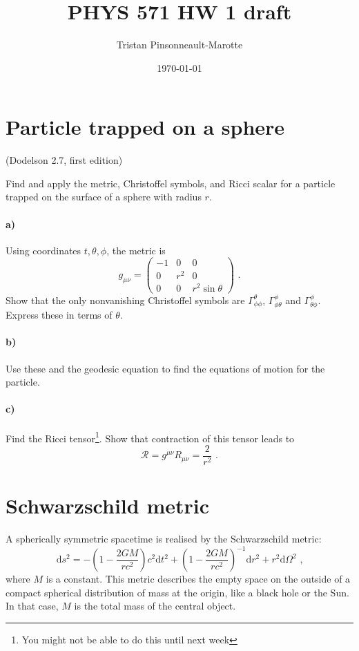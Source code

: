 \documentclass[12pt]{article}
\author{Tristan Pinsonneault-Marotte}
\title{PHYS 571 HW 1 draft}
\date{\today}
\newcommand\diff{\mathrm{d}}
\begin{document}
\maketitle

\section{Particle trapped on a sphere}
(Dodelson 2.7, first edition)

Find and apply the metric, Christoffel symbols, and Ricci scalar for a particle
trapped on the surface of a sphere with radius $r$.

\paragraph{a)} Using coordinates $t, \theta, \phi$, the metric is
\begin{equation}
    g_{\mu\nu} = \begin{pmatrix}
        -1 & 0 & 0 \\
        0 & r^2 & 0 \\
        0 & 0 & r^2 \sin\theta
    \end{pmatrix}
    \text{ .}
\end{equation}
Show that the only nonvanishing Christoffel symbols are
$\Gamma^\theta_{\phi\phi}$, $\Gamma^\phi_{\phi\theta}$ and
$\Gamma^\phi_{\theta\phi}$. Express these in terms of $\theta$.

\paragraph{b)} Use these and the geodesic equation to find the equations of
motion for the particle.

\paragraph{c)} Find the Ricci tensor\footnote{You might not be able to do this until next week}. Show that contraction of this tensor leads
to
\begin{equation}
    \mathcal{R} = g^{\mu\nu} R_{\mu\nu} = \frac{2}{r^2} \text{ .}
\end{equation}

\section{Schwarzschild metric}

A spherically symmetric spacetime is realised by the Schwarzschild metric:
\begin{equation}
    \diff s^2 = - \left(1 - \frac{2 G M}{r c^2}\right) c^2 \diff t^2
    + \left(1 - \frac{2 G M}{r c^2}\right)^{-1} \diff r^2
    + r^2 \diff \Omega^2 \text{ ,}
\label{eq:schwarz}
\end{equation}
where $M$ is a constant. This metric describes the empty space on the outside of
a compact spherical distribution of mass at the origin, like a black hole or the
Sun. In that case, $M$ is the total mass of the central object.
\end{document}
